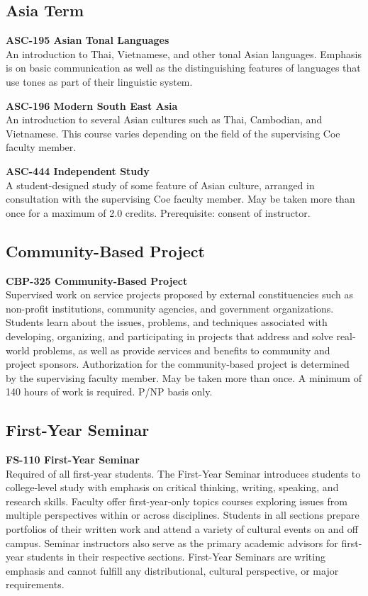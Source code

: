 \documentclass[
  letterpaper,
]{scrbook}
\begin{document}
\subsection{Asia Term}\label{sec-academic-programs-asia-term}

\textbf{ASC-195 Asian Tonal Languages}\\
An introduction to Thai, Vietnamese, and other tonal Asian languages.
Emphasis is on basic communication as well as the distinguishing
features of languages that use tones as part of their linguistic system.

\textbf{ASC-196 Modern South East Asia}\\
An introduction to several Asian cultures such as Thai, Cambodian, and
Vietnamese. This course varies depending on the field of the supervising
Coe faculty member.

\textbf{ASC-444 Independent Study}\\
A student-designed study of some feature of Asian culture, arranged in
consultation with the supervising Coe faculty member. May be taken more
than once for a maximum of 2.0 credits. Prerequisite: consent of
instructor.

\subsection{Community-Based Project}\label{sec-community-based-project}

\textbf{CBP-325 Community-Based Project}\\
Supervised work on service projects proposed by external constituencies
such as non-profit institutions, community agencies, and government
organizations. Students learn about the issues, problems, and techniques
associated with developing, organizing, and participating in projects
that address and solve real-world problems, as well as provide services
and benefits to community and project sponsors. Authorization for the
community-based project is determined by the supervising faculty member.
May be taken more than once. A minimum of 140 hours of work is required.
P/NP basis only.

\subsection{First-Year Seminar}\label{sec-academic-programs-fys}

\textbf{FS-110 First-Year Seminar}\\
Required of all first-year students. The First-Year Seminar introduces
students to college-level study with emphasis on critical thinking,
writing, speaking, and research skills. Faculty offer first-year-only
topics courses exploring issues from multiple perspectives within or
across disciplines. Students in all sections prepare portfolios of their
written work and attend a variety of cultural events on and off campus.
Seminar instructors also serve as the primary academic advisors for
first-year students in their respective sections. First-Year Seminars
are writing emphasis and cannot fulfill any distributional, cultural
perspective, or major requirements.
\end{document}
